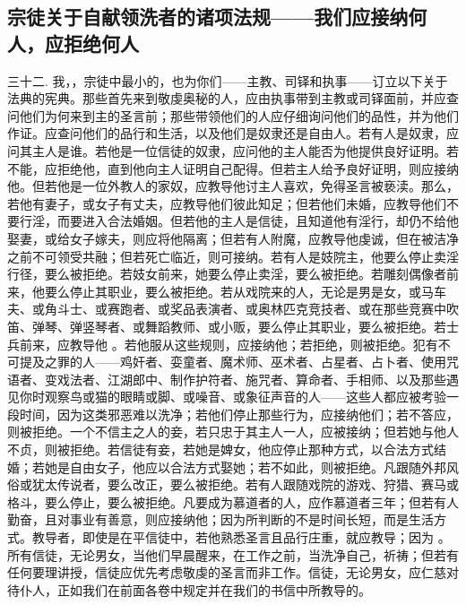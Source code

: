 
\subsection{宗徒关于自献领洗者的诸项法规——我们应接纳何人，应拒绝何人}

三十二. 我，，宗徒中最小的，也为你们——主教、司铎和执事——订立以下关于法典的宪典。那些首先来到敬虔奥秘的人，应由执事带到主教或司铎面前，并应查问他们为何来到主的圣言前；那些带领他们的人应仔细询问他们的品性，并为他们作证。应查问他们的品行和生活，以及他们是奴隶还是自由人。若有人是奴隶，应问其主人是谁。若他是一位信徒的奴隶，应问他的主人能否为他提供良好证明。若不能，应拒绝他，直到他向主人证明自己配得。但若主人给予良好证明，则应接纳他。但若他是一位外教人的家奴，应教导他讨主人喜欢，免得圣言被亵渎。那么，若他有妻子，或女子有丈夫，应教导他们彼此知足；但若他们未婚，应教导他们不要行淫，而要进入合法婚姻。但若他的主人是信徒，且知道他有淫行，却仍不给他娶妻，或给女子嫁夫，则应将他隔离；但若有人附魔，应教导他虔诚，但在被洁净之前不可领受共融；但若死亡临近，则可接纳。若有人是妓院主，他要么停止卖淫行径，要么被拒绝。若妓女前来，她要么停止卖淫，要么被拒绝。若雕刻偶像者前来，他要么停止其职业，要么被拒绝。若从戏院来的人，无论是男是女，或马车夫、或角斗士、或赛跑者、或奖品表演者、或奥林匹克竞技者、或在那些竞赛中吹笛、弹琴、弹竖琴者、或舞蹈教师、或小贩，要么停止其职业，要么被拒绝。若士兵前来，应教导他  。若他服从这些规则，应接纳他；若拒绝，则被拒绝。犯有不可提及之罪的人——鸡奸者、娈童者、魔术师、巫术者、占星者、占卜者、使用咒语者、变戏法者、江湖郎中、制作护符者、施咒者、算命者、手相师、以及那些遇见你时观察鸟或猫的眼睛或脚、或噪音、或象征声音的人——这些人都应被考验一段时间，因为这类邪恶难以洗净；若他们停止那些行为，应接纳他们；若不答应，则被拒绝。一个不信主之人的妾，若只忠于其主人一人，应被接纳；但若她与他人不贞，则被拒绝。若信徒有妾，若她是婢女，他应停止那种方式，以合法方式结婚；若她是自由女子，他应以合法方式娶她；若不如此，则被拒绝。凡跟随外邦风俗或犹太传说者，要么改正，要么被拒绝。若有人跟随戏院的游戏、狩猎、赛马或格斗，要么停止，要么被拒绝。凡要成为慕道者的人，应作慕道者三年；但若有人勤奋，且对事业有善意，则应接纳他；因为所判断的不是时间长短，而是生活方式。教导者，即使是在平信徒中，若他熟悉圣言且品行庄重，就应教导；因为  。所有信徒，无论男女，当他们早晨醒来，在工作之前，当洗净自己，祈祷；但若有任何要理讲授，信徒应优先考虑敬虔的圣言而非工作。信徒，无论男女，应仁慈对待仆人，正如我们在前面各卷中规定并在我们的书信中所教导的。\par

